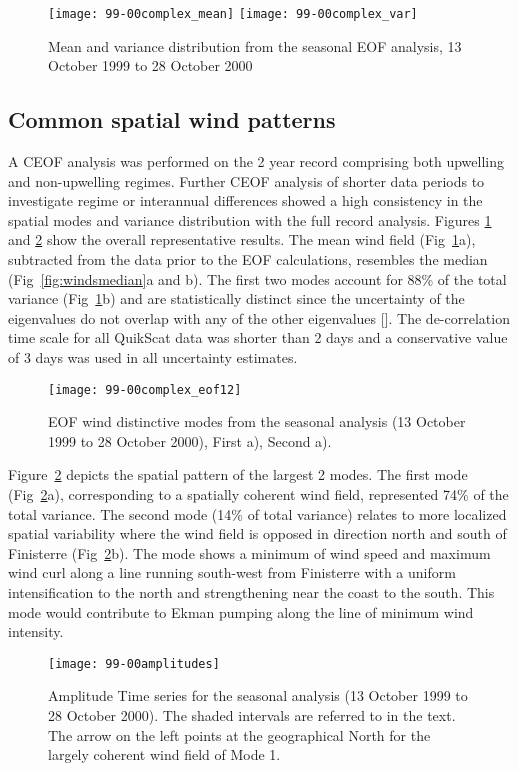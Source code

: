 \begin{figure}
\noindent
\texttt{[image: 99-00complex\_mean]}\quad
\texttt{[image: 99-00complex\_var]}
\caption{Mean and variance distribution from the seasonal EOF
analysis, 13  October 1999 to 28 October 2000
}\label{fig:windsmeanvar}
\end{figure}
\subsection{Common spatial wind patterns}
A CEOF analysis was performed on the 2 year record comprising both
upwelling and non-upwelling regimes. Further CEOF analysis of
shorter data periods to investigate regime or interannual
differences showed a high consistency in the spatial modes and
variance distribution with the full record analysis. Figures
\ref{fig:windsmeanvar} and \ref{fig:windseofseasonal} show the
overall representative results. The mean wind field
(Fig~\ref{fig:windsmeanvar}a), subtracted from the data prior to
the EOF calculations, resembles the median
(Fig~\ref{fig:windsmedian}a and b). The first two modes account
for 88\% of the total variance (Fig~\ref{fig:windsmeanvar}b) and
are statistically distinct since the uncertainty of the
eigenvalues do not overlap with any of the other eigenvalues
\nocite{north82}[]. The
de-correlation time scale for all QuikScat data was shorter than 2
days and a conservative value of 3 days was used in all
uncertainty estimates.
\begin{figure}
\texttt{[image: 99-00complex\_eof12]}
\caption{EOF wind distinctive modes from the seasonal analysis (13
October 1999 to 28 October 2000), First a), Second
a).}\label{fig:windseofseasonal}
\end{figure}

Figure~\ref{fig:windseofseasonal} depicts the spatial pattern of
the largest 2 modes. The first mode
({Fig~\ref{fig:windseofseasonal}}a), corresponding to a spatially
coherent wind field, represented 74\% of the total variance. The
second mode (14\% of total variance) relates to more localized
spatial variability where the wind field is opposed in direction
north and south of Finisterre (Fig~\ref{fig:windseofseasonal}b).
The mode shows a minimum of wind speed and maximum wind curl along
a line running south-west from Finisterre with a uniform
intensification to the north and strengthening near the coast to
the south. This mode would contribute to Ekman pumping along the
line of minimum wind intensity.
\begin{figure}[t]
\texttt{[image: 99-00amplitudes]}
\caption{Amplitude Time series for the seasonal analysis (13
October 1999 to 28 October 2000). The shaded intervals are
referred to in the text. The arrow on the left points at the
geographical North for the largely coherent wind field of Mode
1.}\label{fig:windsampseasonal}
\end{figure}
